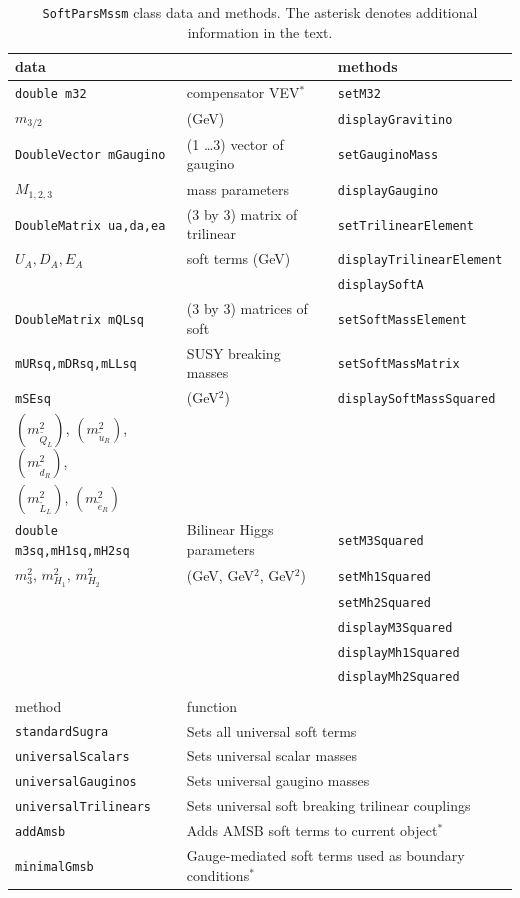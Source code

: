 \documentclass{article}
\def\code#1{\small{\tt #1}\normalsize}
\begin{document}
\begin{table}\begin{center}\begin{tabular}{lll}
data & & methods \\ \hline
\code{double m32} &compensator VEV$^*$ & \code{setM32} \\
$m_{3/2}$ &(GeV) & \code{displayGravitino}\\ \hline
\code{DoubleVector mGaugino} & (1 \ldots 3) vector of gaugino &
\code{setGauginoMass} \\
$M_{1,2,3}$ & mass parameters & \code{displayGaugino} \\ \hline
\code{DoubleMatrix ua,da,ea} & (3 by 3) matrix of trilinear&
\code{setTrilinearElement}\\
$U_A,D_A,E_A$ & soft terms (GeV) &  \code{displayTrilinearElement}\\
 & & \code{displaySoftA} \\ \hline
\code{DoubleMatrix mQLsq} & (3 by 3) matrices of soft &
\code{setSoftMassElement} \\
\code{mURsq,mDRsq,mLLsq} & SUSY breaking masses & \code{setSoftMassMatrix}
\\
\code{mSEsq} & (GeV$^2$) & \code{displaySoftMassSquared} \\ 
$(m_{\tilde Q_L}^2)$, $(m_{\tilde u_R}^2)$, $(m_{\tilde d_R}^2)$,
& & \\ 
$(m_{\tilde L_L}^2)$, $(m_{\tilde e_R}^2)$  & & \\ \hline
\code{double m3sq,mH1sq,mH2sq} & Bilinear Higgs parameters & \code{setM3Squared}\\
$m_3^2$, $m_{H_1}^2$, $m_{H_2}^2$ & (GeV, GeV$^2$, GeV$^2$) & \code{setMh1Squared}\\
 & & \code{setMh2Squared} \\
 & & \code{displayM3Squared} \\
 & & \code{displayMh1Squared} \\
 & & \code{displayMh2Squared} \\ 
\\
method & \multicolumn{2}{l}{function}\\ \hline
\code{standardSugra} & \multicolumn{2}{l}{Sets all universal soft terms}\\
\code{universalScalars} & \multicolumn{2}{l}{Sets universal scalar masses}\\ 
\code{universalGauginos} & \multicolumn{2}{l}{Sets universal gaugino masses}\\ 
\code{universalTrilinears} & \multicolumn{2}{l}{Sets universal soft breaking trilinear
couplings}\\  
\code{addAmsb} & \multicolumn{2}{l}{Adds AMSB soft terms to current
object$^*$}\\ 
\code{minimalGmsb} & \multicolumn{2}{l}{Gauge-mediated soft terms used as
boundary conditions$^*$}\\ 
\hline
\end{tabular}
\caption{ \label{tab:softparsmssm} \code{SoftParsMssm} class data and methods. The asterisk denotes additional information in the text.}\end{center}\end{table}
\end{document}
